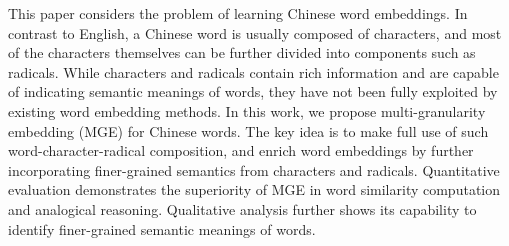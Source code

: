 This paper considers the problem of learning Chinese word embeddings. In contrast to English, a Chinese word is usually composed of characters, and most of the characters themselves can be further divided into components such as radicals. While characters and radicals contain rich information and are capable of indicating semantic meanings of words, they have not been fully exploited by existing word embedding methods. In this work, we propose multi-granularity embedding (MGE) for Chinese words. The key idea is to make full use of such word-character-radical composition, and enrich word embeddings by further incorporating finer-grained semantics from characters and radicals. Quantitative evaluation demonstrates the superiority of MGE in word similarity computation and analogical reasoning. Qualitative analysis further shows its capability to identify finer-grained semantic meanings of words.
